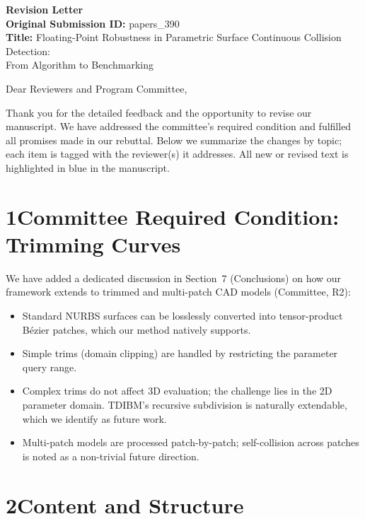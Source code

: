 \documentclass{article}
\begin{document}
\begin{center}
    {\Large \textbf{Revision Letter}} \\[1.5em]
    \textbf{Original Submission ID:} papers\_390 \\[0.5em]
    \textbf{Title:} Floating-Point Robustness in Parametric Surface Continuous Collision Detection:\\ From Algorithm to Benchmarking
\end{center}

\vspace{1em}
\noindent Dear Reviewers and Program Committee,

\vspace{0.5em}
\noindent Thank you for the detailed feedback and the opportunity to revise our manuscript. We have addressed the committee's required condition and fulfilled all promises made in our rebuttal. Below we summarize the changes by topic; each item is tagged with the reviewer(s) it addresses. All new or revised text is highlighted in {\color{blue}blue} in the manuscript.

\section*{1\quad Committee Required Condition: Trimming Curves}

We have added a dedicated discussion in Section~7 (Conclusions) on how our framework extends to trimmed and multi-patch CAD models (Committee, R2):
\begin{itemize}[nosep]
    \item Standard NURBS surfaces can be losslessly converted into tensor-product B\'{e}zier patches, which our method natively supports.
    \item Simple trims (domain clipping) are handled by restricting the parameter query range.
    \item Complex trims do not affect 3D evaluation; the challenge lies in the 2D parameter domain. TDIBM's recursive subdivision is naturally extendable, which we identify as future work.
    \item Multi-patch models are processed patch-by-patch; self-collision across patches is noted as a non-trivial future direction.
\end{itemize}

\section*{2\quad Content and Structure}
\end{document}
